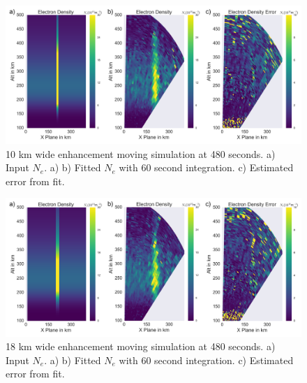 \begin{figure}[!t]
\centering
\includegraphics[width=6in]{moving10kminouterr}
\caption{10 km wide enhancement moving simulation at 480 seconds. a) Input $N_e$. a)  b) Fitted $N_e$ with 60 second integration. c) Estimated error from fit.}
\label{fig:moving10all}
\end{figure}

\begin{figure}[!t]
\centering
\includegraphics[width=6in]{moving18kminouterr}
\caption{18 km wide enhancement moving simulation at 480 seconds. a) Input $N_e$. a)  b) Fitted $N_e$ with 60 second integration. c) Estimated error from fit.}
\label{fig:moving18all}
\end{figure}

